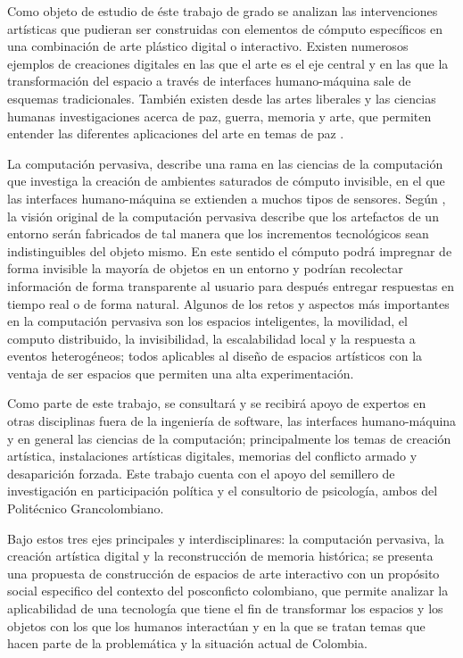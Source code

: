 Como objeto de estudio de éste trabajo de grado se analizan las intervenciones artísticas que pudieran ser construidas con elementos de cómputo específicos en una combinación de arte plástico digital o interactivo. Existen numerosos ejemplos
\cite{RN35,RN25,RN34,RN38,RN31,RN29,RN40,RN37}
de creaciones digitales en las que el arte es el eje central y en las que la transformación del espacio a través de interfaces humano-máquina sale de esquemas tradicionales. También existen desde las artes liberales y las ciencias humanas investigaciones acerca de paz, guerra, memoria y arte, que permiten entender las diferentes aplicaciones del arte en temas de paz \cite{Jimenez201672,SotoAguilar201591,EstripeautBourjac2013154}.

La computación pervasiva, describe una rama en las ciencias de la computación que investiga la creación de ambientes saturados de cómputo invisible, en el que las interfaces humano-máquina se extienden a muchos tipos de sensores. Según \cite{RN1}, la visión original de la computación pervasiva describe que los artefactos de un entorno serán fabricados de tal manera que los incrementos tecnológicos sean indistinguibles del objeto mismo. En este sentido el cómputo podrá impregnar de forma invisible la mayoría de objetos en un entorno y podrían recolectar información de forma transparente al usuario para después entregar respuestas en tiempo real o de forma natural.  Algunos de los retos y aspectos más importantes en la computación pervasiva son los espacios inteligentes, la movilidad, el computo distribuido, la invisibilidad, la escalabilidad local y la respuesta a eventos heterogéneos; todos aplicables al diseño de espacios artísticos con la ventaja de ser espacios que permiten una alta experimentación.

Como parte de este trabajo, se consultará y se recibirá apoyo de expertos en otras disciplinas fuera de la ingeniería de software, las interfaces humano-máquina y en general las ciencias de la computación; principalmente los temas de creación artística, instalaciones artísticas digitales, memorias del conflicto armado y desaparición forzada. Este trabajo cuenta con el apoyo del semillero de investigación en participación política y el consultorio de psicología, ambos del Politécnico Grancolombiano.

Bajo estos tres ejes principales y interdisciplinares: la computación pervasiva, la creación artística digital y la reconstrucción de memoria histórica; se presenta una propuesta de construcción de espacios de arte interactivo con un propósito social especifico del contexto del posconficto colombiano, que permite analizar la aplicabilidad de una tecnología que tiene el fin de transformar los espacios y los objetos con los que los humanos interactúan y en la que se tratan temas que hacen parte de la problemática y la situación actual de Colombia.


